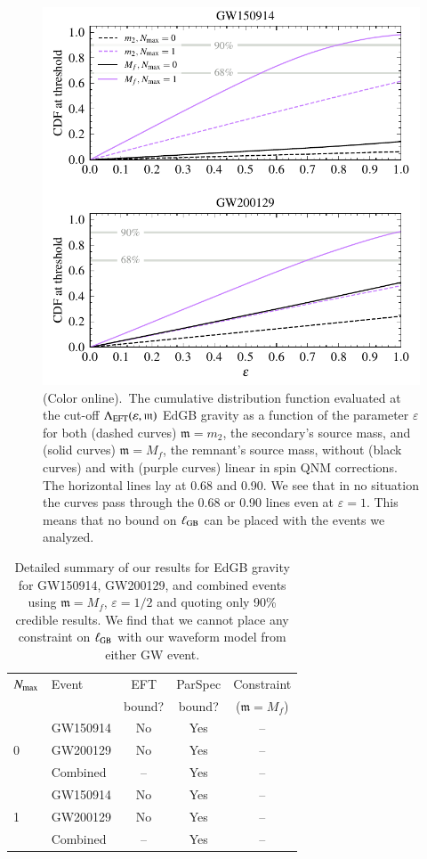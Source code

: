 \documentclass[twocolumn,
               prd,
               aps,
               superscriptaddress,
               tightenlines,
               nofootinbib,
               eqsecnum,
               amsfonts,
               amsmath,
               longbibliography]{revtex4-1}
\newcommand{\gm}{\mathfrak{m}}
\begin{document}
\begin{figure}[t]
\includegraphics[width=\columnwidth]{figs/edgb_cdf_varying_threshold.pdf}
\caption{(Color online).~The cumulative distribution function evaluated at the
cut-off $\Lambda_{\rm EFT}(\varepsilon,\gm)$ EdGB gravity as a function of the parameter
$\varepsilon$ for both (dashed curves) $\gm = m_2$, the secondary's source
mass, and (solid curves) $\gm = M_{f}$, the remnant's source mass, without
(black curves) and with (purple curves) linear in spin QNM corrections. The
horizontal lines lay at 0.68 and 0.90. We see that in no situation the curves pass
through the 0.68 or 0.90 lines even at $\varepsilon = 1$. This means that no bound on $\ell_{\rm GB}$
can be placed with the events we analyzed.
}
\label{fig:edgb_cdf}
\end{figure}

\begin{table}[h]
\begin{tabular}{l l c c c}
\hline
\hline
$N_{\rm max}$ & Event &  EFT    & ParSpec & Constraint      \\
              &       &  bound? & bound?  & ($\gm = M_{f}$) \\
\hline
  & GW150914 & No  & Yes & -- \\
0 & GW200129 & No  & Yes & -- \\
  & Combined & --  & Yes & -- \\
\hline
  & GW150914 & No  & Yes & -- \\
1 & GW200129 & No  & Yes & -- \\
  & Combined & --  & Yes & -- \\
\hline
\hline
\end{tabular}
\caption{Detailed summary of our results for EdGB gravity for GW150914, GW200129, and
combined events using $\gm = M_{f}$, $\varepsilon = 1/2$ and quoting only 90\% credible results.
%
We find that we cannot place any constraint on $\ell_{\rm GB}$ with our waveform model from either GW event.
}
\label{tab:summary_edgb}
\end{table}
\end{document}
